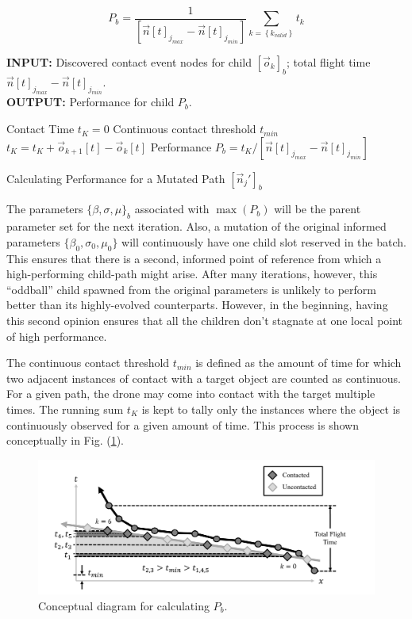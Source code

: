 \documentclass[conf]{new-aiaa}
\begin{document}
\begin{equation}
\label{performance-calc-equation}
P_b = \frac{1}{\left[\vec{n}[t]_{j_{max}} - \vec{n}[t]_{j_{min}}\right]}\sum\limits_{k=\left\{k_{valid}\right\}}t_k
\end{equation}

\begin{algorithm}
\textbf{INPUT:} Discovered contact event nodes for child $\left[\vec{o}_k\right]_b$; total flight time $\vec{n}[t]_{j_{max}} - \vec{n}[t]_{j_{min}}$.\\
\textbf{OUTPUT:} Performance for child $P_b$.
\begin{algorithmic}
\STATE Contact Time $t_K = 0$
\STATE Continuous contact threshold $t_{min}$
\STATE $t_K = t_K + \vec{o}_{k + 1}[t] - \vec{o}_k[t]$
\ENDIF
\ENDFOR
\STATE Performance $P_b = t_K/\left[\vec{n}[t]_{j_{max}} - \vec{n}[t]_{j_{min}}\right]$
\end{algorithmic}
\caption{Calculating Performance for a Mutated Path $\left[\vec{n}_j'\right]_b$}
\label{find-contact-time}
\end{algorithm}

The parameters ${\{\beta, \sigma, \mu\}}_b$ associated with $\max({P_b})$ will be the parent parameter set for the next iteration. Also, a mutation of the original informed parameters $\{\beta_0, \sigma_0, \mu_0\}$ will continuously have one child slot reserved in the batch. This ensures that there is a second, informed point of reference from which a high-performing child-path might arise. After many iterations, however, this ``oddball'' child spawned from the original parameters is unlikely to perform better than its highly-evolved counterparts. However, in the beginning, having this second opinion ensures that all the children don't stagnate at one local point of high performance.

The continuous contact threshold $t_{min}$ is defined as the amount of time for which two adjacent instances of contact with a target object are counted as continuous. For a given path, the drone may come into contact with the target multiple times. The running sum $t_K$ is kept to tally only the instances where the object is continuously observed for a given amount of time. This process is shown conceptually in Fig. (\ref{performance-calc}).

\begin{figure}[hbt!]
\centering
\includegraphics[width=1\textwidth]{figs/performance-calc}
\caption{Conceptual diagram for calculating $P_b$.}
\label{performance-calc}
\end{figure}
\end{document}
